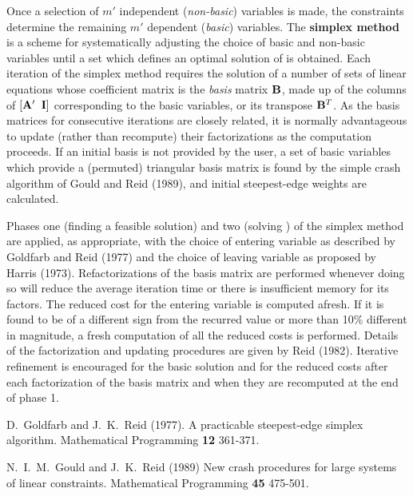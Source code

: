 \documentclass{galahad}
\begin{document}
Once a selection of $m'$ independent ({\em non-basic}) variables
is made, the constraints   determine the remaining $m'$
dependent ({\em basic}) variables. The {\bf simplex method}
is a scheme for systematically adjusting the choice of basic
and non-basic variables until a set which defines an optimal
solution of  is obtained. Each
iteration of the simplex method requires the solution of a number
of sets of linear equations whose coefficient matrix is the
{\em basis} matrix ${\mathbf{B}}$, made up of the columns of $[{\mathbf{A}}' \;\; {\mathbf{I}}]$
corresponding to the
basic variables, or its transpose ${\mathbf{B}}^T$. As the basis matrices for
consecutive iterations are closely related, it is normally
advantageous to update (rather than recompute) their factorizations
as the computation proceeds.
If an initial basis is not provided by the user,
a set of basic variables which provide a (permuted)
triangular basis matrix is found by the simple crash algorithm of
Gould and Reid (1989), and initial steepest-edge weights are calculated.

Phases one (finding a feasible solution)
and two (solving ) of the simplex method are applied, as
appropriate, with the choice of entering variable as described
by Goldfarb and Reid (1977) and the
choice of leaving variable as proposed by Harris (1973).
Refactorizations of the basis matrix are performed whenever doing so
will reduce the average iteration time or there is insufficient memory
for its factors.
The reduced cost for the entering variable is computed afresh. If it
is found to be of a different sign from the recurred value or more than
10\% different in magnitude, a fresh computation of all the reduced
costs is performed.
Details of the factorization and updating procedures are given by
Reid (1982).
Iterative refinement is encouraged for the basic solution and for
the reduced costs after each factorization
of the basis matrix and when they are recomputed at the end of phase 1.

\vspace*{1mm}

\galreferences
\vspace*{1mm}

\noindent
D.\ Goldfarb and J.\ K.\ Reid (1977).
A practicable steepest-edge simplex algorithm.
Mathematical Programming {\bf 12} 361-371.
\vspace*{1mm}

\noindent
N.\ I.\ M.\ Gould and J.\ K.\ Reid (1989)
New crash procedures for large systems of linear constraints.
Mathematical Programming {\bf 45} 475-501.
\vspace*{1mm}
\end{document}
